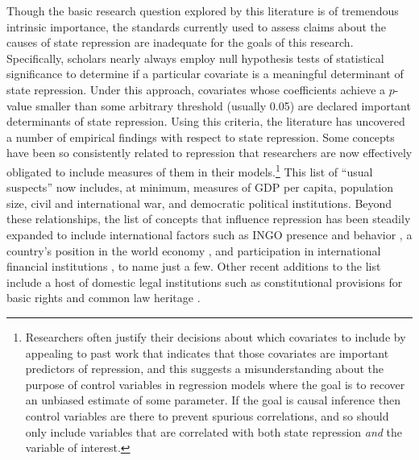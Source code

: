 \documentclass[11pt]{article}
\begin{document}
Though the basic research question explored by this literature is of tremendous intrinsic importance, the standards currently used to assess claims about the causes of state repression are inadequate for the goals of this research. Specifically, scholars nearly always employ null hypothesis tests of statistical significance to determine if a particular covariate is a meaningful determinant of state repression. Under this approach, covariates whose coefficients achieve a $p$-value smaller than some arbitrary threshold (usually 0.05) are declared important determinants of state repression. Using this criteria, the literature has uncovered a number of empirical findings with respect to state repression. Some concepts have been so consistently related to repression that researchers are now effectively obligated to include measures of them in their models.\footnote{Researchers often justify their decisions about which covariates to include by appealing to past work that indicates that those covariates are important predictors of repression, and this suggests a misunderstanding about the purpose of control variables in regression models where the goal is to recover an unbiased estimate of some parameter. If the goal is causal inference then control variables are there to prevent spurious correlations, and so should only include variables that are correlated with both state repression {\em and} the variable of interest.} This list of ``usual suspects'' now includes, at minimum, measures of GDP per capita, population size, civil and international war, and democratic political institutions. Beyond these relationships, the list of concepts that influence repression has been steadily expanded to include international factors such as INGO presence and behavior \citep{HafnerBurtonTsutsui2005, Franklin2008, MurdieDavis2012}, a country's position in the world economy \citep{HafnerBurton2005jpr}, and participation in international financial institutions \citep{AbouharbCingranelli2006, AbouharbCingranelli2007}, to name just a few. Other recent additions to the list include a host of domestic legal institutions such as constitutional provisions for basic rights \citep{Cross1999, KeithTatePoe2009} and common law heritage \citep{Mitchell2013}. 
\end{document}
